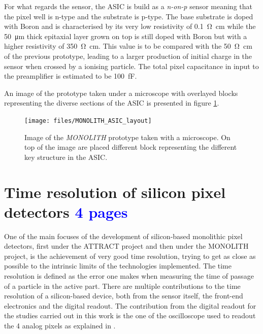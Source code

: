 		For what regards the sensor, the ASIC is build as a \textit{n-on-p} sensor meaning that the pixel well is n-type and the substrate is p-type. The base substrate is doped with Boron and is characterised by its very low resistivity of \SI{0.1}{\ohm \centi\meter} while the \SI{50}{\micro\meter} thick epitaxial layer grown on top is still doped with Boron but with a higher resistivity of \SI{350}{\ohm \centi\meter}. This value is to be compared with the \SI{50}{\ohm \centi\meter} of the previous prototype, leading to a larger production of initial charge in the sensor when crossed by a ionising particle. The total pixel capacitance in input to the preamplifier is estimated to be \SI{100}{\femto\farad}. 
		
		An image of the prototype taken under a microscope with overlayed blocks representing the diverse sections of the ASIC is presented in figure \ref{im:MONOLITH_ASIC_layout}.
		\begin{figure}[h]
			\centering
			\texttt{[image: files/MONOLITH\_ASIC\_layout]}
			\caption{Image of the \textit{MONOLITH} prototype taken with a microscope. On top of the image are placed different block representing the different key structure in the ASIC. }
			\label{im:MONOLITH_ASIC_layout}
		\end{figure} 
		 
		
		
	\clearpage
	\section{Time resolution of silicon pixel detectors \textcolor{blue}{ 4 pages}}
	One of the main focuses of the development of silicon-based monolithic pixel detectors, first under the ATTRACT project and then under the MONOLITH project, is the achievement of very good time resolution, trying to get as close as possible to the intrinsic limits of the technologies implemented. The time resolution is defined as the error one makes when measuring the time of passage of a particle in the active part. There are multiple contributions to the time resolution of a silicon-based device, both from the sensor itself, the front-end electronics and the digital readout. The contribution from the digital readout for the studies carried out in this work is the one of the oscilloscope used to readout the 4 analog pixels as explained in . 
	
